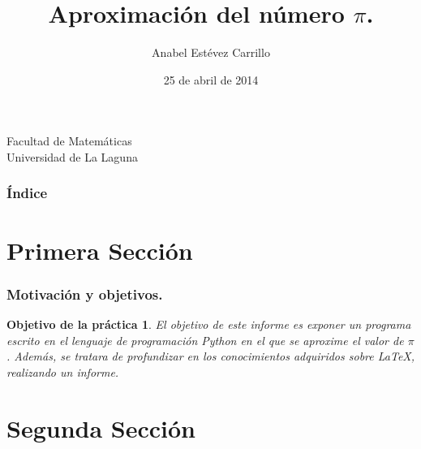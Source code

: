 \documentclass{beamer}
\title[PI]{Aproximación del número $\pi$. }
\author[Anabel]{Anabel Estévez Carrillo}
\date[25-04-2014]{25 de abril de 2014}
\newtheorem{definicion}{Objetivo de la práctica}
\begin{document}
  
\begin{frame}

 \hspace*{7.0cm}

 \titlepage

 \begin{small}
   \begin{center}
    Facultad de Matemáticas \\
    Universidad de La Laguna
   \end{center}
  \end{small}

\end{frame}

\begin{frame}
 \frametitle{Índice}
 \tableofcontents[pausesections]
\end{frame}


\section{Primera Sección}

\begin{frame}

\frametitle{Motivación y objetivos.}

\begin{definicion}

El objetivo de este informe es exponer un programa escrito en el lenguaje de programación Python en el que se aproxime 
el valor de $\pi$. Además, se tratara de profundizar en los conocimientos adquiridos sobre \LaTeX{}, realizando un informe.

\end{definicion}

\end{frame}

\section{Segunda Sección}
\end{document}
